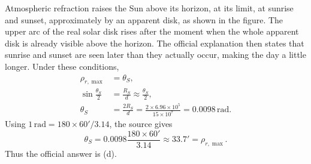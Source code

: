 Atmospheric refraction raises the Sun above its horizon, at its limit, at
sunrise and sunset, approximately by an apparent disk, as shown in the figure.
The upper arc of the real solar disk rises after the moment when the whole
apparent disk is already visible above the horizon. The official explanation
then states that sunrise and sunset are seen later than they actually occur,
making the day a little longer.
Under these conditions,
\begin{align*}
\rho_{r,\max}&=\theta_S,\\
\sin\frac{\theta_S}{2}&=\frac{R_S}{d}\approx\frac{\theta_S}{2},\\
\theta_S&=\frac{2R_S}{d}=\frac{2\times6.96\times10^5}{15\times10^7}
=0.0098\,\mathrm{rad}.
\end{align*}
Using $1\,\mathrm{rad}=180\times60'/3.14$, the source gives
\[
\theta_S=0.0098\frac{180\times60'}{3.14}\approx33.7'=\rho_{r,\max}.
\]
Thus the official answer is (d).
